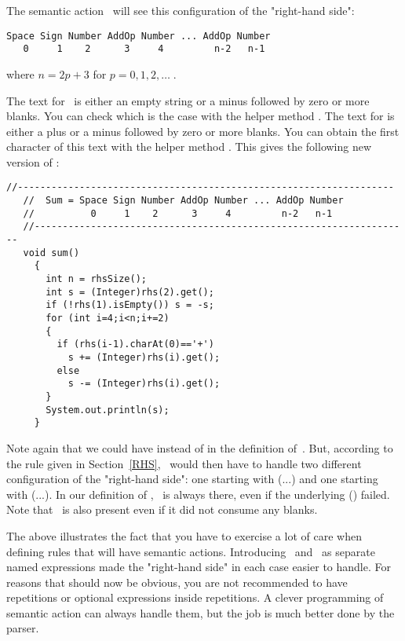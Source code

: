 The semantic action \Suma\ will see this configuration
of the "right-hand side":

\small
\begin{Verbatim}[samepage=true,xleftmargin=15mm,baselinestretch=0.9]
 Space Sign Number AddOp Number ... AddOp Number
   0     1    2      3     4         n-2   n-1
\end{Verbatim}
\normalsize

where $n = 2p + 3$ for $p = 0, 1, 2, \ldots\;$.

The text for \Sign\ is either an empty string
or a minus followed by zero or more blanks.
You can check which is the case with 
the helper method .
The text for  is either a plus or a minus  
followed by zero or more blanks.
You can obtain the first character of this text with
the helper method .
This gives the following new version of \Suma:

\smallskip
\small
\begin{Verbatim}[frame=single,framesep=2mm,samepage=true,xleftmargin=15mm,xrightmargin=15mm,baselinestretch=0.8]
   //-------------------------------------------------------------------
   //  Sum = Space Sign Number AddOp Number ... AddOp Number
   //          0     1    2      3     4         n-2   n-1
   //-------------------------------------------------------------------
   void sum()
     {
       int n = rhsSize();
       int s = (Integer)rhs(2).get();
       if (!rhs(1).isEmpty()) s = -s;
       for (int i=4;i<n;i+=2)
       {
         if (rhs(i-1).charAt(0)=='+')
           s += (Integer)rhs(i).get();
         else
           s -= (Integer)rhs(i).get();
       }
       System.out.println(s);
     }
\end{Verbatim}
\normalsize

Note again that we could have  instead of  in the definition of \Sum\,.
But, according to the rule given in Section~\ref{RHS}, 
\Suma\ would then have to handle two different configuration
of the "right-hand side": 
one starting with (...)
and one starting with (...).
In our definition of \Sum, \Sign\ is always there, even if the underlying () failed.
Note that \Space\ is also present even if it did not consume any blanks.

The above illustrates the fact that you have to exercise a lot of care when defining 
rules that will have semantic actions.
Introducing \Digits\ and \Sign\ as separate named expressions
made the "right-hand side" in each case easier to handle.
For reasons that should now be obvious, you are not recommended
to have repetitions or optional expressions inside repetitions.
A clever programming of semantic action can always handle them,
but the job is much better done by the parser.

